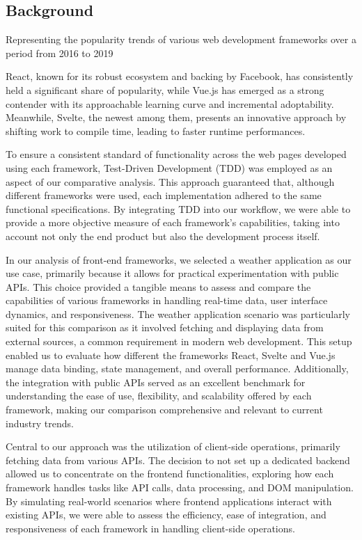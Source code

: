 \subsection*{Background}

Representing the popularity trends of various web development frameworks over a period from 2016 to 2019

React, known for its robust ecosystem and backing by Facebook, has consistently held a significant share of popularity, while Vue.js has emerged as a strong contender with its approachable learning curve and incremental adoptability. Meanwhile, Svelte, the newest among them, presents an innovative approach by shifting work to compile time, leading to faster runtime performances.

To ensure a consistent standard of functionality across the web pages developed using each framework, Test-Driven Development (TDD) was employed as an aspect of our comparative analysis. This approach guaranteed that, although different frameworks were used, each implementation adhered to the same functional specifications. By integrating TDD into our workflow, we were able to provide a more objective measure of each framework's capabilities, taking into account not only the end product but also the development process itself.

In our analysis of front-end frameworks, we selected a weather application as our use case, primarily because it allows for practical experimentation with public APIs. This choice provided a tangible means to assess and compare the capabilities of various frameworks in handling real-time data, user interface dynamics, and responsiveness. The weather application scenario was particularly suited for this comparison as it involved fetching and displaying data from external sources, a common requirement in modern web development. This setup enabled us to evaluate how different the frameworks React, Svelte and Vue.js manage data binding, state management, and overall performance. Additionally, the integration with public APIs served as an excellent benchmark for understanding the ease of use, flexibility, and scalability offered by each framework, making our comparison comprehensive and relevant to current industry trends.

Central to our approach was the utilization of client-side operations, primarily fetching data from various APIs. The decision to not set up a dedicated backend allowed us to concentrate on the frontend functionalities, exploring how each framework handles tasks like API calls, data processing, and DOM manipulation. By simulating real-world scenarios where frontend applications interact with existing APIs, we were able to assess the efficiency, ease of integration, and responsiveness of each framework in handling client-side operations.
